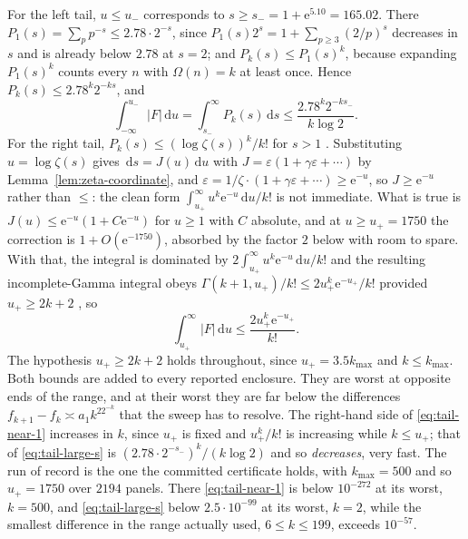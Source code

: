 \documentclass[11pt]{amsart}
\theoremstyle{plain}
\theoremstyle{definition}
\newcommand{\e}{\mathrm e}
\newcommand{\dd}{\,\mathrm d}
\newcommand{\abs}[1]{\lvert #1\rvert}
\begin{document}
For the left tail, $u\leq u_-$ corresponds to $s\geq s_-=1+\e^{5.10}=165.02$.
There $P_1(s)=\sum_pp^{-s}\leq2.78\cdot2^{-s}$, since
$P_1(s)2^{s}=1+\sum_{p\geq3}(2/p)^{s}$ decreases in $s$ and is already below
$2.78$ at $s=2$; and $P_k(s)\leq P_1(s)^k$, because expanding $P_1(s)^k$ counts
every $n$ with $\Omega(n)=k$ at least once. Hence
$P_k(s)\leq2.78^k2^{-ks}$, and
\begin{equation}\label{eq:tail-large-s}
 \int_{-\infty}^{u_-}\!\abs{F}\dd u=\int_{s_-}^\infty\! P_k(s)\dd s
 \leq\frac{2.78^k2^{-ks_-}}{k\log2}.
\end{equation}
For the right tail, $P_k(s)\leq(\log\zeta(s))^k/k!$ for $s>1$
\cite[Lemma 5.6]{Lichtman19}. Substituting $u=\log\zeta(s)$ gives
$\dd s=J(u)\dd u$ with $J=\varepsilon(1+\gamma\varepsilon+\cdots)$ by
Lemma~\ref{lem:zeta-coordinate}, and $\varepsilon=1/\zeta\cdot
(1+\gamma\varepsilon+\cdots)\geq\e^{-u}$, so $J\geq\e^{-u}$ rather than
$\leq$: the clean form $\int_{u_+}^\infty u^k\e^{-u}\dd u/k!$ is not immediate.
What is true is $J(u)\leq\e^{-u}(1+C\e^{-u})$ for $u\geq1$ with $C$ absolute,
and at $u\geq u_+=1750$ the correction is $1+O(\e^{-1750})$, absorbed by the
factor $2$ below with room to spare. With that, the integral is dominated by
$2\int_{u_+}^\infty u^k\e^{-u}\dd u/k!$ and the resulting
incomplete-Gamma integral obeys
$\Gamma(k+1,u_+)/k!\leq2u_+^k\e^{-u_+}/k!$ provided $u_+\geq2k+2$
\cite[\S8.11]{DLMF}, so
\begin{equation}\label{eq:tail-near-1}
 \int_{u_+}^{\infty}\!\abs{F}\dd u\leq\frac{2u_+^k\e^{-u_+}}{k!}.
\end{equation}
The hypothesis $u_+\geq2k+2$ holds throughout, since $u_+=3.5k_{\max}$ and
$k\leq k_{\max}$. Both bounds are added to every reported enclosure. They are
worst at opposite ends of the range, and at their worst they are far below the
differences $f_{k+1}-f_k\asymp a_1k^22^{-k}$ that the sweep has to resolve.
The right-hand side of \eqref{eq:tail-near-1} increases in $k$, since
$u_+$ is fixed and $u_+^k/k!$ is increasing while $k\leq u_+$; that of
\eqref{eq:tail-large-s} is $(2.78\cdot2^{-s_-})^k/(k\log2)$ and so
\emph{decreases}, very fast. The run of record is the one the committed
certificate holds, with $k_{\max}=500$ and so $u_+=1750$ over $2194$ panels.
There \eqref{eq:tail-near-1} is below $10^{-272}$ at its worst, $k=500$, and
\eqref{eq:tail-large-s} below $2.5\cdot10^{-99}$ at its worst, $k=2$, while the
smallest difference in the range actually used, $6\leq k\leq199$, exceeds
$10^{-57}$.
\end{document}
